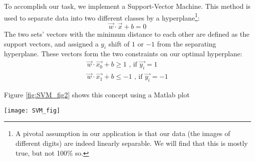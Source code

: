 %
%

To accomplish our task, we implement a Support-Vector Machine. This method is used to separate data into two different classes by a hyperplane\footnote{A pivotal assumption in our application is that our data (the images of different digits) are indeed linearly separable. We will find that this is mostly true, but not 100\% so.}:
\begin{equation}
\vec{w}\cdot\vec{x} + b = 0
\end{equation}
The two sets' vectors with the minimum distance to each other are defined as the support vectors, and assigned a $y_{i}$ shift of $1$ or $-1$ from the separating hyperplane. These vectors form the two constraints on our optimal hyperplane:
\begin{equation}
\begin{gathered}
	\vec{w}\cdot\vec{x_0} + b \geq 1 \text{ , if } \vec{y_i} = 1 \\
	\vec{w}\cdot\vec{x_1} + b \leq -1 \text{ , if } \vec{y_i} = -1 
\end{gathered}
\end{equation}

Figure \ref{fig:SVM_fig2} shows this concept using a Matlab plot

\begin{figure*}[!htb]
	\texttt{[image: SVM\_fig]}
	\centering
	\caption{The hyperplane is constrained to be within the limits of the margin, which are themselves defined by the support vectors. \cite{matlab}}
	\label{fig:SVM_fig2}
\end{figure*}


